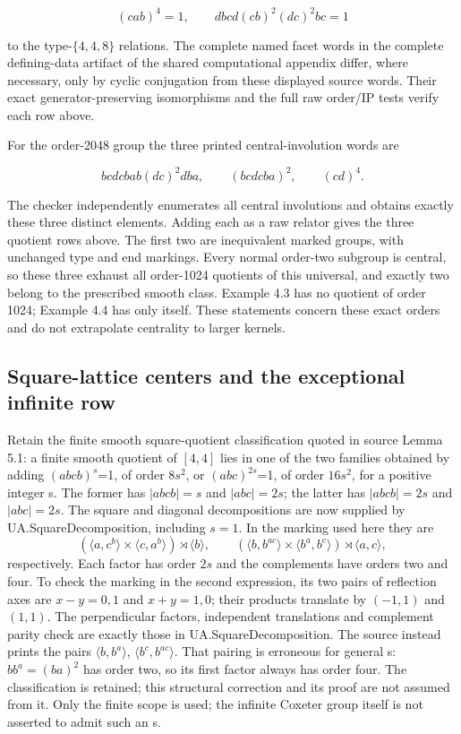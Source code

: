 \[
(cab)^4=1,\qquad dbcd(cb)^2(dc)^2bc=1
\tag{N3}
\]

to the type-\(\{4,4,8\}\) relations. The complete named facet words in the complete defining-data artifact of the shared computational appendix differ, where necessary, only by cyclic conjugation from these displayed source words. Their exact generator-preserving isomorphisms and the full raw order/IP tests verify each row above.

For the order-2048 group the three printed central-involution words are

\[
bcdcbab(dc)^2dba,\qquad(bcdcba)^2,\qquad(cd)^4.
\tag{N4}
\]

The checker independently enumerates all central involutions and obtains exactly these three distinct elements. Adding each as a raw relator gives the three quotient rows above. The first two are inequivalent marked groups, with unchanged type and end markings. Every normal order-two subgroup is central, so these three exhaust all order-1024 quotients of this universal, and exactly two belong to the prescribed smooth class. Example 4.3 has no quotient of order 1024; Example 4.4 has only itself. These statements concern these exact orders and do not extrapolate centrality to larger kernels.

\subsection{Square-lattice centers and the exceptional infinite row}\label{square-lattice-centers-and-the-exceptional-infinite-row}

Retain the finite smooth square-quotient classification quoted in source Lemma 5.1: a finite smooth quotient of \([4,4]\) lies in one of the two families obtained by adding \((abcb)^{s}\)=1, of order \(8s^{2}\), or \((abc)^{2s}\)=1, of order \(16s^{2}\), for a positive integer s. The former has \(|abcb|=s\) and \(|abc|=2s\); the latter has \(|abcb|=2s\) and \(|abc|=2s\). The square and diagonal decompositions are now supplied by UA.SquareDecomposition, including \(s=1\). In the marking used here they are \[
 (\langle a,c^b\rangle\times\langle c,a^b\rangle)\rtimes\langle b\rangle,
 \qquad
 (\langle b,b^{ac}\rangle\times\langle b^a,b^c\rangle)\rtimes\langle a,c\rangle,
\] respectively. Each factor has order \(2s\) and the complements have orders two and four. To check the marking in the second expression, its two pairs of reflection axes are \(x-y=0,1\) and \(x+y=1,0\); their products translate by \((-1,1)\) and \((1,1)\). The perpendicular factors, independent translations and complement parity check are exactly those in UA.SquareDecomposition. The source instead prints the pairs \(\langle b,b^a\rangle\), \(\langle b^c,b^{ac}\rangle\). That pairing is erroneous for general s: \(bb^a=(ba)^2\) has order two, so its first factor always has order four. The classification is retained; this structural correction and its proof are not assumed from it. Only the finite scope is used; the infinite Coxeter group itself is not asserted to admit such an s.

